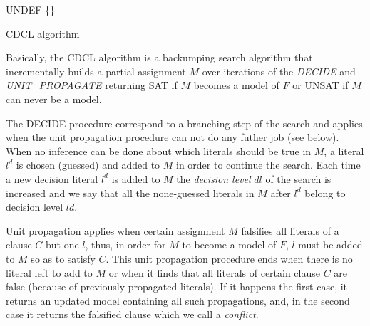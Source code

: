 \documentclass{llncs}
\begin{document}
\begin{algorithm}
 \BlankLine
 \Status \assign UNDEF\;
 \Model \assign \{\}\;
 \Return \Status
 \caption{CDCL algorithm}
 \label{alg:cdcl}
\end{algorithm}

Basically, the CDCL algorithm is a backumping search algorithm 
that incrementally builds a partial assignment $M$ over iterations of the
\emph{DECIDE} and \emph{UNIT\_PROPAGATE} returning SAT if $M$ becomes a model of $F$ or 
UNSAT if $M$ can never be a model. 

The DECIDE procedure
correspond to a branching step of the search and 
applies when the unit propagation procedure can not do any futher job (see below).
When no inference can be done about which literals should be true in $M$, a 
literal $l^d$ is chosen (guessed) and added to $M$ in order to 
continue the search.
Each time a new decision literal $l^d$ is added to $M$ the \emph{
decision level} $dl$ of the search is increased and we say that 
all the none-guessed literals in $M$ after $l^d$ belong to decision level $ld$.

Unit propagation
applies when certain assignment $M$ falsifies all literals of a clause $C$ 
but one $l$, thus, in order for $M$ to become a model of $F$, $l$ 
must be added to $M$ so as to satisfy $C$. This unit propagation procedure ends
when there is no literal left to add to $M$ or when it finds that all literals
of certain clause $C$ are false (because of previously propagated literals). 
If it happens the first case, it returns 
an updated model containing all such propagations, and, in the second case
it returns the falsified clause which we call a \emph{conflict}. 
\end{document}
